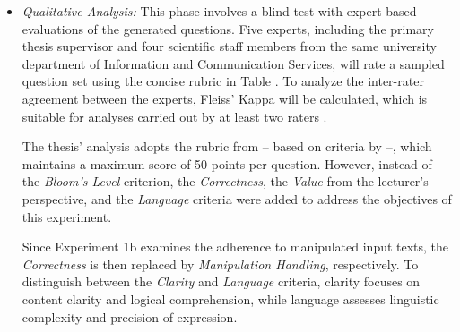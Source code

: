\begin{itemize}
\begin{itemize}
        \item \textit{Qualitative Analysis:} This phase involves a blind-test with expert-based evaluations of the generated questions. Five experts, including the primary thesis supervisor and four scientific staff members from the same university department of Information and Communication Services, will rate a sampled question set using the concise rubric in Table . To analyze the inter-rater agreement between the experts, Fleiss' Kappa will be calculated, which is suitable for analyses carried out by at least two raters \cite{fleiss_measuring_1971}.
        
        The thesis' analysis adopts the rubric from \cite{mi_comparative_2024} -- based on criteria by \cite{moore_assessing_2022} --, which maintains a maximum score of 50 points per question. However, instead of the \textit{Bloom's Level} criterion, the \textit{Correctness}, the \textit{Value} from the lecturer's perspective, and the \textit{Language} criteria were added to address the objectives of this experiment.
        
        Since Experiment 1b examines the adherence to manipulated input texts, the \textit{Correctness} is then replaced by \textit{Manipulation Handling}, respectively. To distinguish between the \textit{Clarity} and \textit{Language} criteria, clarity focuses on content clarity and logical comprehension, while language assesses linguistic complexity and precision of expression.


\end{itemize}
\end{itemize}
